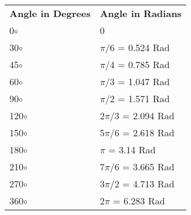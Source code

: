 \begin{table}
\centering
\begin{tabular}{ll}
\textbf{Angle in Degrees} & \textbf{Angle in Radians}  \\
0$\circ$        & 0                             \\
30$\circ$       & $\pi$/6 = 0.524 Rad            \\
45$\circ$       & $\pi$/4 = 0.785 Rad            \\
60$\circ$       & $\pi$/3 = 1.047 Rad            \\
90$\circ$       & $\pi$/2 = 1.571 Rad            \\
120$\circ$      & 2$\pi$/3 = 2.094 Rad           \\
150$\circ$      & 5$\pi$/6 = 2.618 Rad           \\
180$\circ$      & $\pi$ = 3.14 Rad               \\
210$\circ$      & 7$\pi$/6 = 3.665 Rad           \\
270$\circ$      & 3$\pi$/2 = 4.713 Rad           \\
360$\circ$      & 2$\pi$ = 6.283 Rad            
\end{tabular}
\end{table}